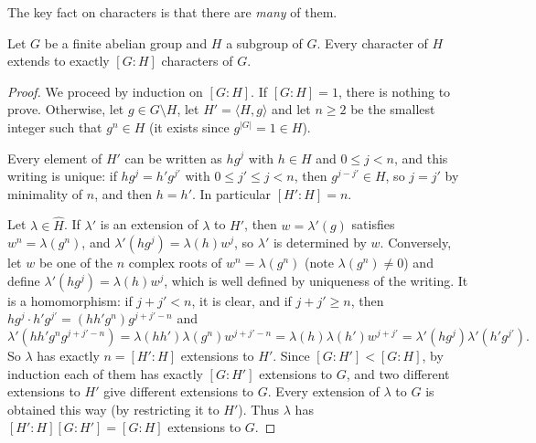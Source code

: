 The key fact on characters is that there are \emph{many} of them.
\begin{lemma}\label{lem:extension_char}
    Let $G$ be a finite abelian group and $H$ a subgroup of $G$. Every character of $H$ extends to exactly $[G:H]$ characters of $G$.
\end{lemma}
\begin{proof}
    We proceed by induction on $[G:H]$. If $[G:H] = 1$, there is nothing to prove. Otherwise, let $g\in G\setminus H$, let $H' = \langle H,g\rangle$ and let $n\ge 2$ be the smallest integer such that $g^n\in H$ (it exists since $g^{\lvert G\rvert} = 1 \in H$).

    Every element of $H'$ can be written as $hg^j$ with $h\in H$ and $0\le j<n$, and this writing is unique: if $hg^j = h'g^{j'}$ with $0 \le j' \le j < n$, then $g^{j-j'}\in H$, so $j = j'$ by minimality of $n$, and then $h = h'$. In particular $[H':H] = n$.

    Let $\lambda\in\widehat H$. If $\lambda'$ is an extension of $\lambda$ to $H'$, then $w = \lambda'(g)$ satisfies $w^n = \lambda(g^n)$, and $\lambda'(hg^j) = \lambda(h)w^j$, so $\lambda'$ is determined by $w$. Conversely, let $w$ be one of the $n$ complex roots of $w^n = \lambda(g^n)$ (note $\lambda(g^n)\neq0$) and define $\lambda'(hg^j) = \lambda(h)w^j$, which is well defined by uniqueness of the writing. It is a homomorphism: if $j + j' <n$, it is clear, and if $j + j'\ge n$, then $hg^j\cdot h'g^{j'} = (hh'g^n)g^{j+j'-n}$ and
    \begin{equation*}
        \lambda'\left(hh'g^n g^{j+j'-n}\right) = \lambda(hh')\lambda(g^n)w^{j+j'-n} = \lambda(h)\lambda(h')w^{j+j'} = \lambda'(hg^j)\lambda'(h'g^{j'}).
    \end{equation*}
    So $\lambda$ has exactly $n = [H':H]$ extensions to $H'$. Since $[G:H'] < [G:H]$, by induction each of them has exactly $[G:H']$ extensions to $G$, and two different extensions to $H'$ give different extensions to $G$. Every extension of $\lambda$ to $G$ is obtained this way (by restricting it to $H'$). Thus $\lambda$ has $[H':H][G:H'] = [G:H]$ extensions to $G$.
\end{proof}

